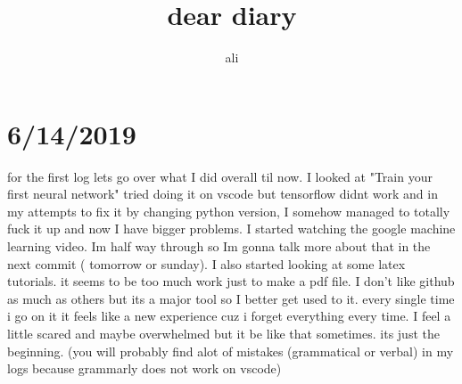 \documentclass{article}
\begin{document}
 
\title{\LARGE{\textbf{dear diary}}}
\author{ali}
\maketitle
\newpage
\tableofcontents
\newpage

\section{6/14/2019}
for the first log lets go over what I did overall til now.
I looked at "Train your first neural network"
tried doing it on vscode but tensorflow didnt work and in my attempts to fix it by changing python version, 
I somehow managed to totally fuck it up and now I have bigger problems.
I started watching the google machine learning video. Im half way through so Im gonna talk more about that in the next commit ( tomorrow or sunday).
I also started looking at some latex tutorials. it seems to be too much work just to make a pdf file.
I don't like github as much as others but its a major tool so I better get used to it. every single time i go on it it feels like a new experience cuz i forget everything every time.
I feel a little scared and maybe overwhelmed but it be like that sometimes. its just the beginning.
(you will probably find alot of mistakes (grammatical or verbal) in my logs because grammarly does not work on vscode)
\end{document}
